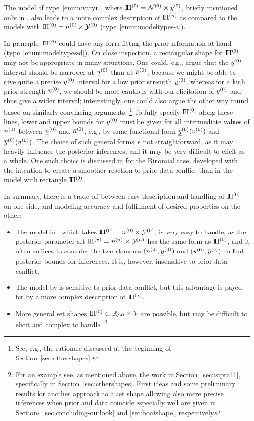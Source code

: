The model of type~\eqref{enum:varyn}, where $\text{I}\!\Pi^{(0)} = \mathcal{N}^{(0)} \times y^{(0)}$,
briefly mentioned only in \textcite[footnote no.~10 in \S 1.1.4, and \S 7.8.3]{1991:walley},
also leads to a more complex description of $\text{I}\!\Pi^{(n)}$ as compared to the models with $\text{I}\!\Pi^{(0)} = n^{(0)} \times \mathcal{Y}^{(0)}$ (type~\eqref{enum:modeltypes-a}).

In principle, $\text{I}\!\Pi^{(0)}$ could have any form fitting the prior information at hand (type~\eqref{enum:modeltypes-d}).
On close inspection, a rectangular shape for $\text{I}\!\Pi^{(0)}$ may not be appropriate in many situations.
One could, e.g., argue that the $y^{(0)}$ interval should be narrower at $\underline{n}^{(0)}$ than at $\overline{n}^{(0)}$,
because we might be able to give quite a precise $y^{(0)}$ interval for a low prior strength $\underline{n}^{(0)}$,
whereas for a high prior strength $\overline{n}^{(0)}$, we should be more cautious with our elicitation of $y^{(0)}$ and thus give a wider interval;
interestingly, one could also argue the other way round based on similarly convincing arguments.%
\footnote{See, e.g., the rationale discussed at the beginning of Section~\ref{sec:othershapes}.}
To fully specify $\text{I}\!\Pi^{(0)}$ along these lines,
lower and upper bounds for $y^{(0)}$ must be given for all intermediate values of $n^{(0)}$ between $\underline{n}^{(0)}$ and $\overline{n}^{(0)}$,
e.g., by some functional form $\underline{y}^{(0)}(n^{(0)})$ and $\overline{y}^{(0)}(n^{(0)})$.
The choice of such general forms is not straightforward,
as it may heavily influence the posterior inferences,
and it may be very difficult to elicit as a whole.
One such choice is discussed in \textcite[\S 2.3, see Section~\ref{sec:othershapes}]{Walter2011a} for the Binomial case,
developed with the intention to create a smoother reaction to prior-data conflict than in the model with rectangle $\text{I}\!\Pi^{(0)}$.

In summary, there is a trade-off between easy description and handling of $\text{I}\!\Pi^{(0)}$ on one side,
and modeling accuracy and fulfillment of desired properties on the other:
\begin{itemize}%
\item The model in \textcite{2005:quaeghebeurcooman}, which takes $\text{I}\!\Pi^{(0)} = n^{(0)} \times \mathcal{Y}^{(0)}$, is very easy to handle,
as the posterior parameter set $\text{I}\!\Pi^{(n)} = n^{(n)} \times \mathcal{Y}^{(n)}$ has the same form as $\text{I}\!\Pi^{(0)}$,
and it often suffices to consider the two elements $(n^{(0)}, \underline{y}^{(0)})$ and $(n^{(0)}, \overline{y}^{(0)})$ to find posterior bounds for inferences.
It is, however, insensitive to prior-data conflict.
\item The model by \textcite{Walter2009a} is sensitive to prior-data conflict,
but this advantage is payed for by a more complex description of $\text{I}\!\Pi^{(n)}$.
\item More general set shapes $\text{I}\!\Pi^{(0)} \subset \mathbb{R}_{>0} \times \mathcal{Y}$ are possible,
but may be difficult to elicit and complex to handle.%
\footnote{For an example see, as mentioned above, the work in Section~\ref{sec:isipta11}, specifically in Section~\ref{sec:othershapes}.
First ideas and some preliminary results for another approach to a set shape allowing
also more precise inferences when prior and data coincide especially well
are given in Sections~\ref{sec:concluding-outlook} and \ref{sec:boatshape}, respectively.}
\end{itemize}

